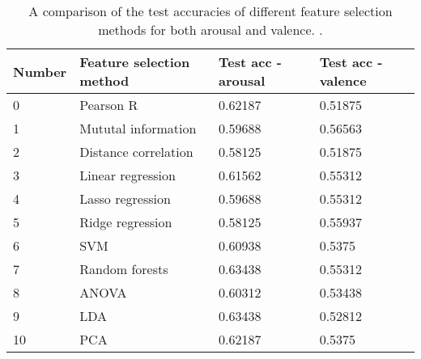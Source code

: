 \begin{table}[H]
\centering
\caption{A comparison of the test accuracies of different feature selection methods for both arousal and valence. \label{genacctable}.}
\begin{tabular}{llll}
\textbf{Number} & \textbf{Feature selection method} & \textbf{Test acc - arousal} & \textbf{Test acc - valence} \\ \hline
0               & Pearson R                          & 0.62187                             & 0.51875                             \\
1               & Mututal information                            & 0.59688                             & 0.56563                             \\
2               & Distance correlation                             & 0.58125                             & 0.51875                             \\
3               & Linear regression                                & 0.61562                             & 0.55312                             \\
4               & Lasso regression                                & 0.59688                             & 0.55312                             \\
5               & Ridge regression                                & 0.58125                             & 0.55937                             \\
6               & SVM                & 0.60938                             & 0.5375                              \\
7               & Random forests           & 0.63438                             & 0.55312                             \\
8               & ANOVA                             & 0.60312                             & 0.53438                             \\
9               & LDA                               & 0.63438                             & 0.52812                             \\
10              & PCA                               & 0.62187                             & 0.5375                             
\end{tabular}
\end{table}


